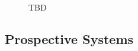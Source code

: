 \begin{figure}
  \begin{center}
    \resizebox{\linewidth}{!}{}
  \end{center}
  \caption{TBD \label{fig:prosp}}
\end{figure}


\subsection{Prospective Systems}
